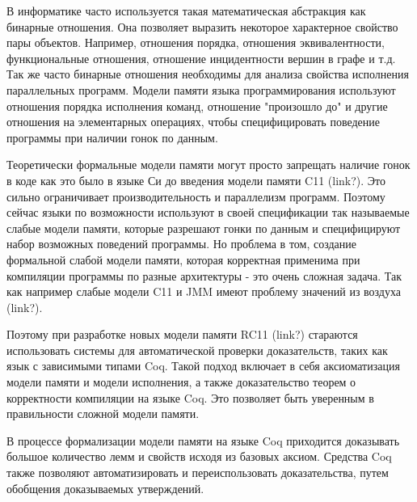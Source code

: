 \documentclass[times,specification,annotation]{itmo-student-thesis}
\begin{document}

\tableofcontents

\startprefacepage


 В информатике часто используется такая математическая абстракция как бинарные отношения.
Она позволяет выразить некоторое характерное свойство пары объектов. Например, отношения порядка, отношения эквивалентности, функциональные отношения, отношение инцидентности вершин в графе и т.д.
Так же часто бинарные отношения необходимы для анализа свойства исполнения параллельных программ. Модели памяти языка программирования используют отношения порядка исполнения команд, отношение "произошло до" и другие отношения на элементарных операциях, чтобы специфицировать поведение программы при наличии гонок по данным.

Теоретически формальные модели памяти могут просто запрещать наличие гонок в коде как это было в языке Си до введения модели памяти C11 (link?). Это сильно ограничивает производительность и параллелизм программ. Поэтому сейчас языки по возможности используют в своей спецификации так называемые слабые модели памяти, которые разрешают гонки по данным и специфицируют набор возможных поведений программы. Но проблема в том, создание формальной слабой модели памяти, которая корректная применима при компиляции программы по разные архитектуры - это очень сложная задача. Так как например слабые модели C11 и JMM имеют проблему значений из воздуха (link?).

Поэтому при разработке новых модели памяти RC11 (link?) стараются использовать системы для автоматической проверки доказательств, таких как язык с зависимыми типами Coq.
Такой подход включает в себя аксиоматизация модели памяти и модели исполнения, а
также доказательство теорем о корректности компиляции на языке Coq. Это позволяет быть уверенным в правильности сложной модели памяти.

В процессе формализации модели памяти на языке Coq приходится доказывать большое количество лемм и свойств исходя из базовых аксиом. Средства Coq также позволяют автоматизировать и переиспользовать доказательства, путем обобщения доказываемых утверждений.
\end{document}
